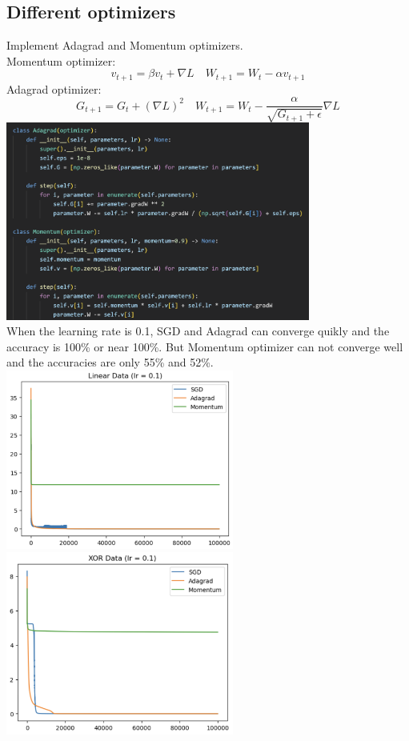 \documentclass{article} %
\begin{document}
    \subsection{Different optimizers}
    Implement Adagrad and Momentum optimizers. \\
    Momentum optimizer: \\
    \[
    v_{t+1} = \beta v_t + \nabla L \quad
    W_{t+1} = W_t - \alpha v_{t+1}
    \]Adagrad optimizer: \\
    \[
    G_{t+1} = G_t + (\nabla L)^2 \quad
    W_{t+1} = W_t - \frac{\alpha}{\sqrt{G_{t+1}+\epsilon}} \nabla L
    \]\includegraphics[width=10cm]{./imgs/opts.png} \\
    When the learning rate is 0.1, SGD and Adagrad can converge quikly and the accuracy is 100\% or near 100\%.
    But Momentum optimizer can not converge well and the accuracies are only 55\% and 52\%. \\
    \includegraphics[width=7.5cm]{./imgs/linear_opt_0.1.png}
    \includegraphics[width=7.5cm]{./imgs/xor_opt_0.1.png} \\
\end{document}
